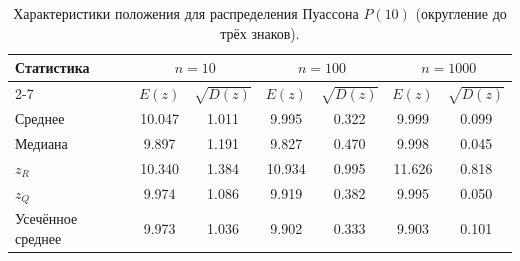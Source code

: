 \begin{table}[H]
\centering
\small
\begin{tabular}{|l|cc|cc|cc|}
\hline
\multirow{2}{*}{Статистика} & \multicolumn{2}{c|}{$n=10$} & \multicolumn{2}{c|}{$n=100$} & \multicolumn{2}{c|}{$n=1000$} \\
\cline{2-7}
 & $E(z)$ & $\sqrt{D(z)}$ & $E(z)$ & $\sqrt{D(z)}$ & $E(z)$ & $\sqrt{D(z)}$ \\
\hline
Среднее & 10.047 & 1.011 & 9.995 & 0.322 & 9.999 & 0.099 \\
\hline
Медиана & 9.897 & 1.191 & 9.827 & 0.470 & 9.998 & 0.045 \\
\hline
$z_R$ & 10.340 & 1.384 & 10.934 & 0.995 & 11.626 & 0.818 \\
\hline
$z_Q$ & 9.974 & 1.086 & 9.919 & 0.382 & 9.995 & 0.050 \\
\hline
Усечённое среднее & 9.973 & 1.036 & 9.902 & 0.333 & 9.903 & 0.101 \\
\hline
\end{tabular}
\caption{Характеристики положения для распределения Пуассона $P(10)$ (округление до трёх знаков).}
\label{tab:poisson_rounded}
\end{table}